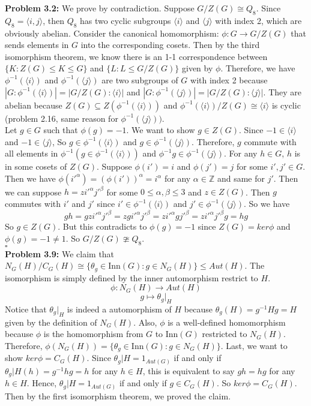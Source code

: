 \documentclass[12pt]{amsart}
\newcommand{\Z}{\mathbb{Z}}
\begin{document}
    \textbf{Problem 3.2:} We prove by contradiction. Suppose $G/Z(G)\cong Q_8$. Since $Q_8=\langle i, j\rangle$, then $Q_8$ has two cyclic subgroups $\langle i \rangle$ and $\langle j\rangle$ with index 2, which are obviously abelian. Consider the canonical homomorphism: $\phi: G \rightarrow G/Z(G)$ that sends elements in $G$ into the corresponding cosets. Then by the third isomorphism theorem, we know there is an 1-1 correspondence between $\{K: Z(G)\leq K\leq G\}$ and $\{L: L\leq G/Z(G)\}$ given by $\phi$. Therefore, we have $\phi^{-1}(\langle i\rangle)$ and $\phi^{-1}(\langle j \rangle)$ are two subgroups of $G$ with index 2 because $|G:\phi^{-1}(\langle i\rangle)|=|G/Z(G):\langle i \rangle|$ and $|G:\phi^{-1}(\langle j\rangle)|=|G/Z(G):\langle j \rangle|$. They are abelian because $Z(G)\subseteq Z(\phi^{-1}(\langle i \rangle))$ and $\phi^{-1}(\langle i \rangle)/Z(G)\cong \langle i \rangle$ is cyclic (problem 2.16, same reason for $\phi^{-1}(\langle j \rangle))$. \\
    Let $g\in G$ such that $\phi(g)=-1$. We want to show $g\in Z(G)$. Since $-1\in \langle i\rangle$ and $-1\in \langle j \rangle$, So $g\in \phi^{-1}(\langle i\rangle)$ and $g\in \phi^{-1}(\langle j\rangle)$. Therefore, $g$ commute with all elements in $\phi^{-1}(g\in \phi^{-1}(\langle i\rangle))$ and $\phi^{-1}g\in \phi^{-1}(\langle j\rangle)$. For any $h\in G$, $h$ is in some cosets of $Z(G)$. Suppose $\phi(i')=i$ and $\phi(j')=j$ for some $i',j'\in G$. Then we have $\phi(i'^\alpha)=(\phi(i'))^\alpha=i^\alpha$ for any $\alpha \in \Z$ and same for $j'$. Then we can suppose $h=zi'^\alpha j'^\beta$ for some $0\leq\alpha,\beta \leq 3$ and $z\in Z(G)$. Then $g$ commutes with $i'$ and $j'$ since $i'\in \phi^{-1}(\langle i\rangle)$ and $j'\in \phi^{-1}(\langle j\rangle)$. So we have 
    \[gh=gzi'^\alpha j'^\beta =zgi'^\alpha j'^\beta =zi'^\alpha gj'^\beta=zi'^\alpha j'^\beta g =hg\]
    So $g\in Z(G)$. But this contradicts to $\phi(g)=-1$ since $Z(G)=ker\phi$ and $\phi(g)=-1\neq 1$. So $G/Z(G)\ncong Q_8$.
    \\\phantom{qed}\hfill$\square$\\
    \textbf{Problem 3.9:}
    We claim that $N_G(H)/C_G(H)\cong \{\theta_g\in\text{Inn}(G):g\in N_G(H)\}\leq Aut(H)$. The isomorphism is simply defined by the inner automorphism restrict to $H$. 
    \[\phi:N_G(H)\rightarrow Aut(H)\]
    \[g\mapsto \theta_g|_H\]
    Notice that $\theta_g|_H$ is indeed a automorphism of $H$ because $\theta_g(H)=g^{-1}Hg=H$ given by the definition of $N_G(H)$. Also, $\phi$ is a well-defined homomorphism because $\phi$ is the homomorphism from $G$ to Inn$(G)$ restricted to $N_G(H)$. Therefore, $\phi(N_G(H))=\{\theta_g\in\text{Inn}(G):g\in N_G(H)\}$. Last, we want to show $ker\phi=C_G(H)$. Since $\theta_g|H=1_{Aut(G)}$ if and only if $\theta_g|H(h)=g^{-1}hg=h$ for any $h\in H$, this is equivalent to say $gh=hg$ for any $h\in H$. Hence, $\theta_g|H=1_{Aut(G)}$ if and only if $g\in C_G(H)$. So $ker\phi=C_G(H)$. Then by the first isomorphism theorem, we proved the claim.
\end{document}
